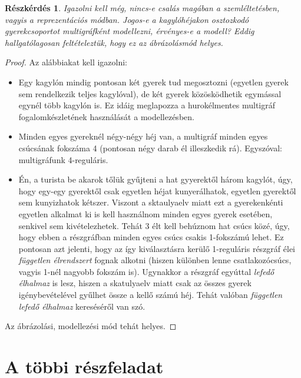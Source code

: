 \documentclass{article}
\newtheorem*{subquestion}{Részkérdés}
\begin{document}
	\begin{subquestion}
		Igazolni kell még, nincs-e csalás magában a szemléltetésben, vagyis a reprezentációs módban.
		Jogos-e a kagylóhéjakon osztozkodó gyerekcsoportot multigráfként modellezni, érvényes-e a modell?
		Eddig hallgatólagosan feltételeztük, hogy ez az ábrázolásmód helyes.
	\end{subquestion}
	\begin{proof}
		Az alábbiakat kell igazolni:
		\begin{itemize}
			\item Egy kagylón mindig pontosan két gyerek tud megosztozni (egyetlen gyerek sem rendelkezik teljes kagylóval), de két gyerek közösködhetik egymással egynél több kagylón is. Ez idáig meglapozza a hurokélmentes multigráf fogalomkészletének használását a modellezésben.
			\item Minden egyes gyereknél négy-négy héj van, a multigráf minden egyes csúcsának fokszáma 4 (pontosan négy darab él illeszkedik rá). Egyszóval: multigráfunk 4-reguláris.
			\item Én, a turista be akarok tőlük gyűjteni a hat gyyerektől három kagylót, úgy, hogy egy-egy gyerektől csak egyetlen héjat kunyerálhatok, egyetlen gyerektől sem kunyizhatok kétszer. Viszont a sktaulyaelv miatt ezt a gyerekenkénti egyetlen alkalmat ki is kell használnom minden egyes gyerek esetében, senkivel sem kivételezhetek. Tehát 3 élt kell behúznom hat csúcs közé, úgy, hogy ebben a részgráfban minden egyes csúcs csakis 1-fokszámú lehet. Ez pontosan azt jelenti, hogy az így kiválasztásra kerülő 1-reguláris részgráf élei \emph{független élrendszert} fognak alkotni (hiszen különben lenne csatlakozócsúcs, vagyis 1-nél nagyobb fokszám is). Ugynakkor a részgráf egyúttal \emph{lefedő élhalmaz} is lesz, hiszen a skatulyaelv miatt csak az összes gyerek igénybevételével gyűlhet össze a kellő számú héj. Tehát valóban \emph{független lefedő élhalmaz} kereséséről van szó.
		\end{itemize}

		Az ábrázolási, modellezési mód tehát helyes.
	\end{proof}

	\section{A többi részfeladat}
\end{document}
